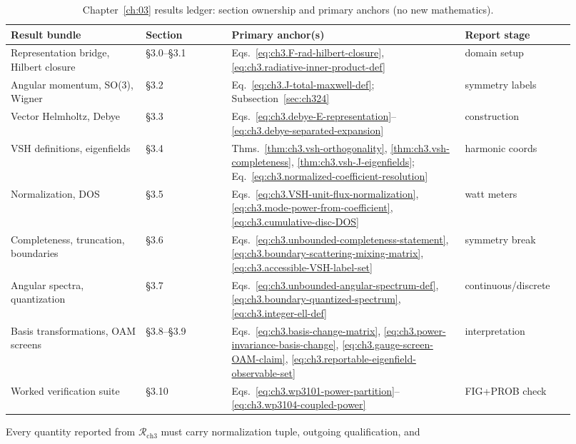 \begin{table}[t]
\centering
\caption{Chapter~\ref{ch:03} results ledger: section ownership and primary anchors (no new mathematics).}
\label{tab:ch3.results-ledger}
\small
\begin{tabular}{@{}p{0.22\linewidth}p{0.14\linewidth}p{0.38\linewidth}p{0.18\linewidth}@{}}
\toprule
Result bundle & Section & Primary anchor(s) & Report stage \\
\midrule
Representation bridge, Hilbert closure &
§3.0--§3.1 &
Eqs.~\eqref{eq:ch3.F-rad-hilbert-closure}, \eqref{eq:ch3.radiative-inner-product-def} &
domain setup \\
Angular momentum, SO(3), Wigner &
§3.2 &
Eq.~\eqref{eq:ch3.J-total-maxwell-def}; Subsection~\ref{sec:ch324} &
symmetry labels \\
Vector Helmholtz, Debye &
§3.3 &
Eqs.~\eqref{eq:ch3.debye-E-representation}--\eqref{eq:ch3.debye-separated-expansion} &
construction \\
VSH definitions, eigenfields &
§3.4 &
Thms.~\ref{thm:ch3.vsh-orthogonality}, \ref{thm:ch3.vsh-completeness}, \ref{thm:ch3.vsh-J-eigenfields};
Eq.~\eqref{eq:ch3.normalized-coefficient-resolution} &
harmonic coords \\
Normalization, DOS &
§3.5 &
Eqs.~\eqref{eq:ch3.VSH-unit-flux-normalization}, \eqref{eq:ch3.mode-power-from-coefficient},
\eqref{eq:ch3.cumulative-disc-DOS} &
watt meters \\
Completeness, truncation, boundaries &
§3.6 &
Eqs.~\eqref{eq:ch3.unbounded-completeness-statement}, \eqref{eq:ch3.boundary-scattering-mixing-matrix},
\eqref{eq:ch3.accessible-VSH-label-set} &
symmetry break \\
Angular spectra, quantization &
§3.7 &
Eqs.~\eqref{eq:ch3.unbounded-angular-spectrum-def}, \eqref{eq:ch3.boundary-quantized-spectrum},
\eqref{eq:ch3.integer-ell-def} &
continuous/discrete \\
Basis transformations, OAM screens &
§3.8--§3.9 &
Eqs.~\eqref{eq:ch3.basis-change-matrix}, \eqref{eq:ch3.power-invariance-basis-change},
\eqref{eq:ch3.gauge-screen-OAM-claim}, \eqref{eq:ch3.reportable-eigenfield-observable-set} &
interpretation \\
Worked verification suite &
§3.10 &
Eqs.~\eqref{eq:ch3.wp3101-power-partition}--\eqref{eq:ch3.wp3104-coupled-power} &
FIG+PROB check \\
\bottomrule
\end{tabular}
\end{table}
Every quantity reported from \(\mathcal{R}_{\mathrm{ch3}}\) must carry normalization tuple, outgoing qualification, and
